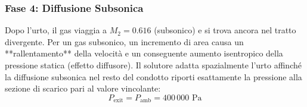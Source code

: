 \documentclass[11pt,a4paper]{article}
\begin{document}
\subsubsection{Fase 4: Diffusione Subsonica}
Dopo l'urto, il gas viaggia a $M_2 = 0.616$ (subsonico) e si trova ancora nel tratto divergente. Per un gas subsonico, un incremento di area causa un **rallentamento** della velocità e un conseguente aumento isentropico della pressione statica (effetto diffusore).
Il solutore adatta spazialmente l'urto affinché la diffusione subsonica nel resto del condotto riporti esattamente la pressione alla sezione di scarico pari al valore vincolante:
\begin{equation}
    P_{\text{exit}} = P_{\text{amb}} = 400\,000 \text{ Pa}
\end{equation}
\end{document}
